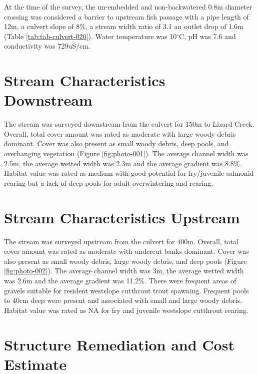 \documentclass[
]{book}
\begin{document}
At the time of the survey, the un-embedded and non-backwatered 0.8m diameter crossing was considered a barrier to upstream fish passage with a pipe length of 12m, a culvert slope of 8\%, a stream width ratio of 3.1 an outlet drop of 1.6m (Table \ref{tab:tab-culvert-020}). Water temperature was 10\(^\circ\)C, pH was 7.6 and conductivity was 729uS/cm.

\hypertarget{stream-characteristics-downstream-1}{%
\section*{Stream Characteristics Downstream}\label{stream-characteristics-downstream-1}}

The stream was surveyed downstream from the culvert for 150m to Lizard Creek. Overall, total cover amount was rated as moderate with large woody debris dominant. Cover was also present as small woody debris, deep pools, and overhanging vegetation (Figure \ref{fig:photo-001}). The average channel width was 2.5m, the average wetted width was 2.3m and the average gradient was 8.8\%. Habitat value was rated as medium with good potential for fry/juvenile salmonid rearing but a lack of deep pools for adult overwintering and rearing.

\hypertarget{stream-characteristics-upstream-1}{%
\section*{Stream Characteristics Upstream}\label{stream-characteristics-upstream-1}}

The stream was surveyed upstream from the culvert for 400m. Overall, total cover amount was rated as moderate with undercut banks dominant. Cover was also present as small woody debris, large woody debris, and deep pools (Figure \ref{fig:photo-002}). The average channel width was 3m, the average wetted width was 2.6m and the average gradient was 11.2\%. There were frequent areas of gravels suitable for resident westslope cutthrout trout spawning. Frequent pools to 40cm deep were present and associated with small and large woody debris. Habitat value was rated as NA for fry and juvenile westslope cutthrout rearing.

\hypertarget{structure-remediation-and-cost-estimate-1}{%
\section*{Structure Remediation and Cost Estimate}\label{structure-remediation-and-cost-estimate-1}}
\end{document}
